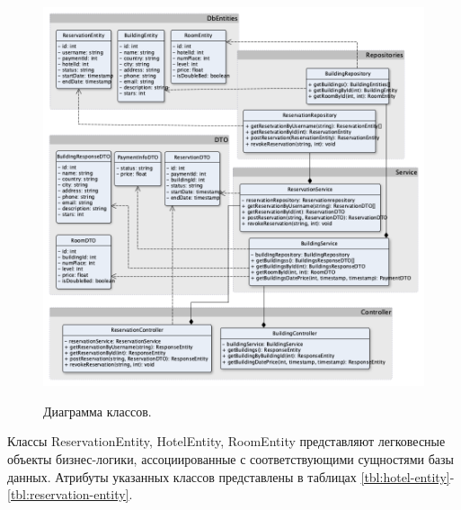 \begin{figure}[h!]
	\begin{center}
		{\includegraphics[scale = 0.58]{img/diag_classes/classes.png}}
		\caption{Диаграмма классов.}
		\label{fig:diag-classes}
	\end{center}
\end{figure} 

Классы ReservationEntity, HotelEntity, RoomEntity представляют легковесные объекты бизнес-логики, ассоциированные с соответствующими сущностями базы данных. Атрибуты указанных классов представлены в таблицах \ref{tbl:hotel-entity}-\ref{tbl:reservation-entity}.

